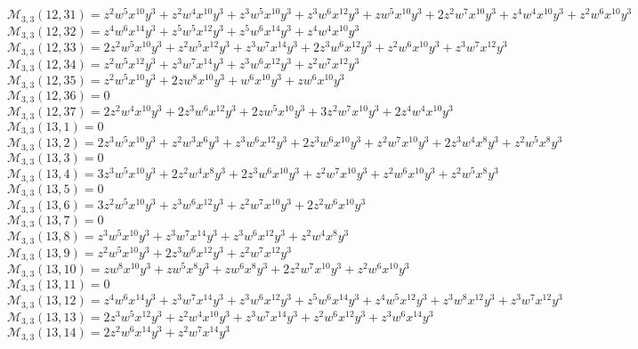 $\mathcal{M}_{3,3}(12,31)=z^2w^5x^{10}y^3+z^2w^4x^{10}y^3+z^3w^5x^{10}y^3+z^3w^6x^{12}y^3+zw^5x^{10}y^3+2z^2w^7x^{10}y^3+z^4w^4x^{10}y^3+z^2w^6x^{10}y^3$\\
$\mathcal{M}_{3,3}(12,32)=z^4w^6x^{14}y^3+z^5w^5x^{12}y^3+z^5w^6x^{14}y^3+z^4w^4x^{10}y^3$\\
$\mathcal{M}_{3,3}(12,33)=2z^2w^5x^{10}y^3+z^2w^5x^{12}y^3+z^3w^7x^{14}y^3+2z^3w^6x^{12}y^3+z^2w^6x^{10}y^3+z^3w^7x^{12}y^3$\\
$\mathcal{M}_{3,3}(12,34)=z^2w^5x^{12}y^3+z^3w^7x^{14}y^3+z^3w^6x^{12}y^3+z^2w^7x^{12}y^3$\\
$\mathcal{M}_{3,3}(12,35)=z^2w^5x^{10}y^3+2zw^8x^{10}y^3+w^6x^{10}y^3+zw^6x^{10}y^3$\\
$\mathcal{M}_{3,3}(12,36)=0$\\
$\mathcal{M}_{3,3}(12,37)=2z^2w^4x^{10}y^3+2z^3w^6x^{12}y^3+2zw^5x^{10}y^3+3z^2w^7x^{10}y^3+2z^4w^4x^{10}y^3$\\
$\mathcal{M}_{3,3}(13,1)=0$\\
$\mathcal{M}_{3,3}(13,2)=2z^3w^5x^{10}y^3+z^2w^3x^6y^3+z^3w^6x^{12}y^3+2z^3w^6x^{10}y^3+z^2w^7x^{10}y^3+2z^3w^4x^8y^3+z^2w^5x^8y^3$\\
$\mathcal{M}_{3,3}(13,3)=0$\\
$\mathcal{M}_{3,3}(13,4)=3z^3w^5x^{10}y^3+2z^2w^4x^8y^3+2z^3w^6x^{10}y^3+z^2w^7x^{10}y^3+z^2w^6x^{10}y^3+z^2w^5x^8y^3$\\
$\mathcal{M}_{3,3}(13,5)=0$\\
$\mathcal{M}_{3,3}(13,6)=3z^2w^5x^{10}y^3+z^3w^6x^{12}y^3+z^2w^7x^{10}y^3+2z^2w^6x^{10}y^3$\\
$\mathcal{M}_{3,3}(13,7)=0$\\
$\mathcal{M}_{3,3}(13,8)=z^3w^5x^{10}y^3+z^3w^7x^{14}y^3+z^3w^6x^{12}y^3+z^2w^4x^8y^3$\\
$\mathcal{M}_{3,3}(13,9)=z^2w^5x^{10}y^3+2z^3w^6x^{12}y^3+z^2w^7x^{12}y^3$\\
$\mathcal{M}_{3,3}(13,10)=zw^8x^{10}y^3+zw^5x^8y^3+zw^6x^8y^3+2z^2w^7x^{10}y^3+z^2w^6x^{10}y^3$\\
$\mathcal{M}_{3,3}(13,11)=0$\\
$\mathcal{M}_{3,3}(13,12)=z^4w^6x^{14}y^3+z^3w^7x^{14}y^3+z^3w^6x^{12}y^3+z^5w^6x^{14}y^3+z^4w^5x^{12}y^3+z^3w^8x^{12}y^3+z^3w^7x^{12}y^3$\\
$\mathcal{M}_{3,3}(13,13)=2z^3w^5x^{12}y^3+z^2w^4x^{10}y^3+z^3w^7x^{14}y^3+z^2w^6x^{12}y^3+z^3w^6x^{14}y^3$\\
$\mathcal{M}_{3,3}(13,14)=2z^2w^6x^{14}y^3+z^2w^7x^{14}y^3$\\
